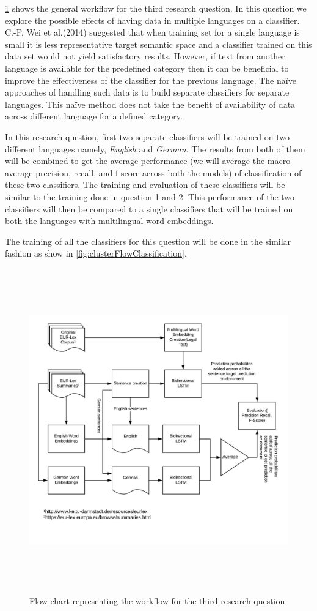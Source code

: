 \ref{fig:FlowResearchQuestion3} shows the general workflow for the third research question. In this question we explore the possible effects of having data in multiple languages on a classifier. C.-P. Wei et al.(2014)\cite{Wei:2014:EPD:2566999.2567111} suggested that when training set for a single language is small it is less representative target semantic space and a classifier trained on this data set would not yield satisfactory results. However, if text from another language is available for the predefined category then it can be beneficial to improve the effectiveness of the classifier for the previous language. The naïve approaches of handling such data is to build separate classifiers for separate languages. This naïve method does not take the benefit of availability of data across different language for a defined category. 

In this research question, first two separate classifiers will be trained on two different languages namely, \textit{English} and \textit{German}. The results from both of them will be combined to get the average performance (we will average the macro-average precision, recall, and f-score across both the models) of classification of these two classifiers. The training and evaluation of these classifiers will be similar to the training done in question 1 and 2. This performance of the two classifiers will then be compared to a single classifiers that will be trained on both the languages with multilingual word embeddings.

The training of all the classifiers for this question will be done in the similar fashion as show in \ref{fig:clusterFlowClassification}.


\begin{figure}[!ht]
    \centering
    \includegraphics[width=15cm, height=14cm,keepaspectratio]{pics/flowforQuestion3.jpeg}
    \caption{Flow chart representing the workflow for the third research question}
    \label{fig:FlowResearchQuestion3}
\end{figure}